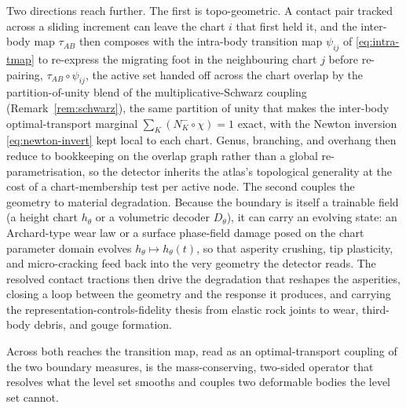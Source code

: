 \documentclass{svjour3}                 %
\newcommand{\tmap}{\tau_{AB}}
\begin{document}
Two directions reach further. The first is topo-geometric. A contact pair tracked across a sliding increment can
leave the chart $i$ that first held it, and the inter-body map $\tmap$ then composes with the intra-body
transition map $\psi_{ij}$ of \eqref{eq:intra-tmap} to re-express the migrating foot in the neighbouring chart
$j$ before re-pairing, $\tmap\circ\psi_{ij}$, the active set handed off across the chart overlap by the
partition-of-unity blend of the multiplicative-Schwarz coupling (Remark~\ref{rem:schwarz}), the same partition
of unity that makes the inter-body optimal-transport marginal $\sum_K(N_K^-\!\circ\chi)=1$ exact, with the
Newton inversion \eqref{eq:newton-invert} kept local to each chart. Genus, branching, and overhang then reduce to
bookkeeping on the overlap graph rather than a global re-parametrisation, so the detector inherits the atlas's
topological generality at the cost of a chart-membership test per active node. The second couples the geometry
to material degradation. Because the boundary is itself a trainable field (a height chart $h_\theta$ or a
volumetric decoder $D_\theta$), it can carry an evolving state: an Archard-type wear law or a surface
phase-field damage posed on the chart parameter domain evolves $h_\theta\mapsto h_\theta(t)$, so that asperity
crushing, tip plasticity, and micro-cracking feed back into the very geometry the detector reads. The resolved
contact tractions then drive the degradation that reshapes the asperities, closing a loop between the geometry
and the response it produces, and carrying the representation-controls-fidelity thesis from elastic rock joints
to wear, third-body debris, and gouge formation.

Across both reaches the transition map, read as an optimal-transport coupling of the two boundary measures, is
the mass-conserving, two-sided operator that resolves what the level set smooths and couples two deformable
bodies the level set cannot.
\end{document}
